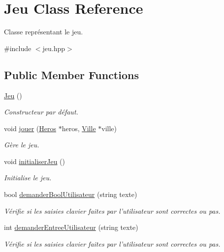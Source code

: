 \hypertarget{class_jeu}{\section{Jeu Class Reference}
\label{class_jeu}
}


Classe représentant le jeu.  




{\ttfamily \#include $<$jeu.\-hpp$>$}

\subsection*{Public Member Functions}
\begin{DoxyCompactItemize}
\item 
\hyperlink{class_jeu_acc5795ee00edf75516d3dfe65be3e6d6}{Jeu} ()
\begin{DoxyCompactList}\small\item\em Constructeur par défaut. \end{DoxyCompactList}\item 
void \hyperlink{class_jeu_ab049953d4de15842e4e3523c4323bc9e}{jouer} (\hyperlink{class_heros}{Heros} $\ast$heros, \hyperlink{class_ville}{Ville} $\ast$ville)
\begin{DoxyCompactList}\small\item\em Gère le jeu. \end{DoxyCompactList}\item 
void \hyperlink{class_jeu_a437282d939ce54d7f3e2eeb56dc0fce7}{initialiser\-Jeu} ()
\begin{DoxyCompactList}\small\item\em Initialise le jeu. \end{DoxyCompactList}\item 
bool \hyperlink{class_jeu_a3aa07b1e7a5e5d82479b8bb2a2841635}{demander\-Bool\-Utilisateur} (string texte)
\begin{DoxyCompactList}\small\item\em Vérifie si les saisies clavier faites par l'utilisateur sont correctes ou pas. \end{DoxyCompactList}\item 
int \hyperlink{class_jeu_ac504a2a26ad7aa3c4281f8ab40cdc445}{demander\-Entree\-Utilisateur} (string texte)
\begin{DoxyCompactList}\small\item\em Vérifie si les saisies clavier faites par l'utilisateur sont correctes ou pas. \end{DoxyCompactList}\item 

\end{DoxyCompactItemize}
